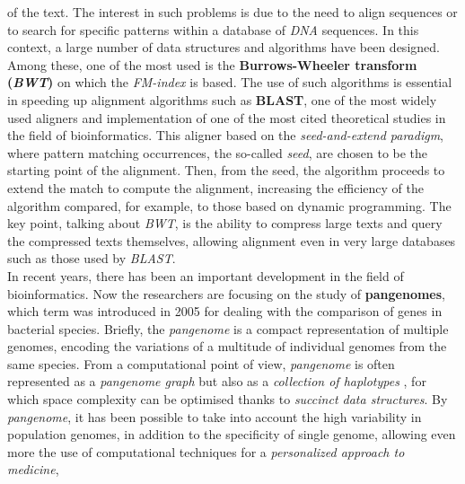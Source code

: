 \documentclass[a4paper,11pt, oneside]{article}
\newcommand{\gdv}[1]{\todo[backgroundcolor=green]{\textbf{GDV} #1}}
\newcommand{\dc}[1]{\todo[backgroundcolor=yellow]{\textbf{DC} #1}}
\begin{document}
of the text. The interest in such 
problems is due to the need to align sequences or to search for specific
patterns within a database of \textit{DNA} sequences. 
In this context, a large number of data structures and algorithms have been
designed. Among these, one of the most used is the \textbf{Burrows-Wheeler
  transform (\textit{BWT})} on which the \textit{FM-index} is based. 
The use of such 
algorithms is essential in speeding up alignment algorithms such as
\textbf{BLAST}, one of the most widely used aligners and implementation of one
of the most cited theoretical studies in the field of bioinformatics.
This aligner based on the \textit{seed-and-extend paradigm}, where pattern
matching occurrences, the so-called \textit{seed}, are chosen to be the starting
point of 
the alignment. Then, from the seed, the algorithm proceeds to extend the match
to compute the alignment, increasing the efficiency of the
algorithm compared, for example, to those based on dynamic programming.
The key point, talking about \textit{BWT}, is the ability to compress large
texts and query the compressed texts themselves, allowing alignment even 
in very large databases such as those used by \textit{BLAST}.\\
In recent years, there has been an important development
in the field of bioinformatics. Now the 
researchers are focusing on the study of \textbf{pangenomes}, which
term was introduced
in 2005 for dealing with the comparison of genes in
bacterial species. Briefly, the \textit{pangenome} is a compact 
representation of multiple genomes, encoding the variations of a multitude of
individual genomes from the same species. From a computational point of view,
\textit{pangenome} is often represented as a \textit{pangenome graph} but also
as a \textit{collection of haplotypes} \cite{pancon}, for which space complexity
can be optimised thanks to \textit{succinct data structures}. By
\textit{pangenome}, it has been possible to take into account the high
variability in population genomes, in 
addition to the specificity of single genome, allowing even more the use of
computational techniques for a \textit{personalized approach to medicine},
\end{document}
